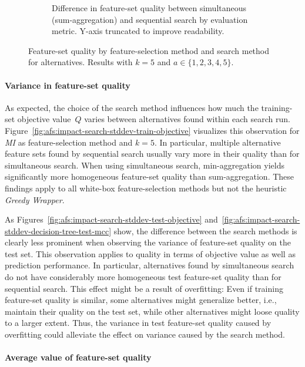 \documentclass{article}
\theoremstyle{definition}
\begin{document}
\begin{figure}[htb]
\begin{subfigure}[t]{0.48\textwidth}
		\caption{
			Difference in feature-set quality between simultaneous (sum-aggregation) and sequential search by evaluation metric.
			Y-axis truncated to improve readability.
		}
		\label{fig:afs:impact-search-fs-method-metric-diff}
	\end{subfigure}
	\caption{
		Feature-set quality by feature-selection method and search method for alternatives.
		Results with $k=5$ and $a \in \{1,2,3,4,5\}$.
	}
	\label{fig:afs:impact-search-fs-method-quality}
\end{figure}

\paragraph{Variance in feature-set quality}

As expected, the choice of the search method influences how much the training-set objective value~$Q$ varies between alternatives found within each search run.
Figure~\ref{fig:afs:impact-search-stddev-train-objective} visualizes this observation for \emph{MI} as feature-selection method and $k=5$.
In particular, multiple alternative feature sets found by sequential search usually vary more in their quality than for simultaneous search.
When using simultaneous search, min-aggregation yields significantly more homogeneous feature-set quality than sum-aggregation.
These findings apply to all white-box feature-selection methods but not the heuristic \emph{Greedy Wrapper}.

As Figures~\ref{fig:afs:impact-search-stddev-test-objective} and~\ref{fig:afs:impact-search-stddev-decision-tree-test-mcc} show, the difference between the search methods is clearly less prominent when observing the variance of feature-set quality on the test set.
This observation applies to quality in terms of objective value as well as prediction performance.
In particular, alternatives found by simultaneous search do not have considerably more homogeneous test feature-set quality than for sequential search.
This effect might be a result of overfitting:
Even if training feature-set quality is similar, some alternatives might generalize better, i.e., maintain their quality on the test set, while other alternatives might loose quality to a larger extent.
Thus, the variance in test feature-set quality caused by overfitting could alleviate the effect on variance caused by the search method.

\paragraph{Average value of feature-set quality}
\end{document}
